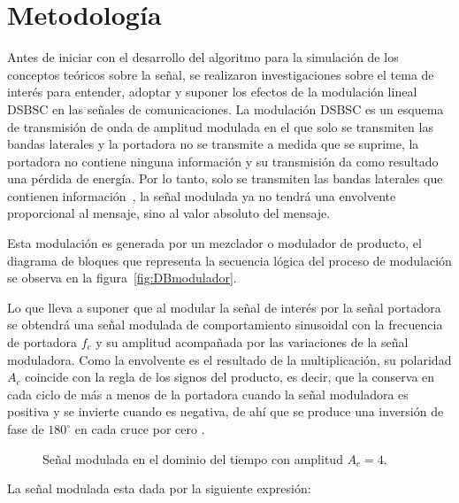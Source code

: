 \section{Metodología}%
\label{sec:metodologia}

Antes de iniciar con el desarrollo del algoritmo para la simulación de los conceptos teóricos sobre la señal, se realizaron investigaciones sobre el tema de interés para entender, adoptar y suponer los efectos de la modulación lineal DSBSC en las señales de comunicaciones. La modulación DSBSC es un esquema de transmisión de onda de amplitud modulada en el que solo se transmiten las bandas laterales y la portadora no se transmite a medida que se suprime, la portadora no contiene ninguna información y su transmisión da como resultado una pérdida de energía. Por lo tanto, solo se transmiten las bandas laterales que contienen información~\cite{coach_double_nodate}, la señal modulada ya no tendrá una envolvente proporcional al mensaje, sino al valor absoluto del mensaje.

Esta modulación es generada por un mezclador o modulador de producto, el diagrama de bloques que representa la secuencia lógica del proceso de modulación se observa en la figura~\ref{fig:DBmodulador}.



Lo que lleva a suponer que al modular la señal de interés por la señal portadora se obtendrá una señal modulada de comportamiento sinusoidal con la frecuencia de portadora $f_c$ y su amplitud acompañada por las variaciones de la señal moduladora. Como la envolvente es el resultado de la multiplicación, su polaridad $A_c$ coincide con la regla de los signos del producto, es decir, que la conserva en cada ciclo de más a menos de la portadora cuando la señal moduladora es positiva y se invierte cuando es negativa, de ahí que se produce una inversión de fase de $180^\circ$ en cada cruce por cero \cite{SuarezVargas2012}.

\vspace{-2mm}
\begin{figure}[H]
	\centering
	\def\svgwidth{5cm}
	\tiny{
		
	}
	\vspace{-3mm}
	\caption{\scriptsize Señal modulada en el dominio del tiempo con amplitud $A_c=4$.}
	\label{fig:modulacion}
\end{figure}
\vspace{-4mm}

La señal modulada esta dada por la siguiente expresión:

